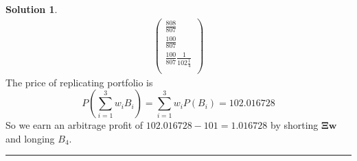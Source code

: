 \documentclass[a4paper, 10pt]{article}
\theoremstyle{definition}
\theoremstyle{hSol}
\newtheorem*{solution}{Solution}
\begin{document}
\begin{solution}
\begin{equation}
\begin{split}
  \begin{pmatrix}
    \frac{808}{807} \\
    \frac{100}{807} \\
    \frac{100}{807}\frac{1}{102\tfrac{1}{4}} \\
  \end{pmatrix} 
\end{split}
\end{equation}
The price of replicating portfolio is
\begin{equation}
    P\left(\sum_{i=1}^3 w_i B_i\right) = \sum_{i=1}^3 w_i P(B_i)= 102.016728
\end{equation}
So we earn an arbitrage profit of $102.016728-101 = 1.016728$ by shorting $\bm{\Xi w}$ and longing $B_4$.

\end{solution}

\noindent\rule{16cm}{0.4pt}
\end{document}
